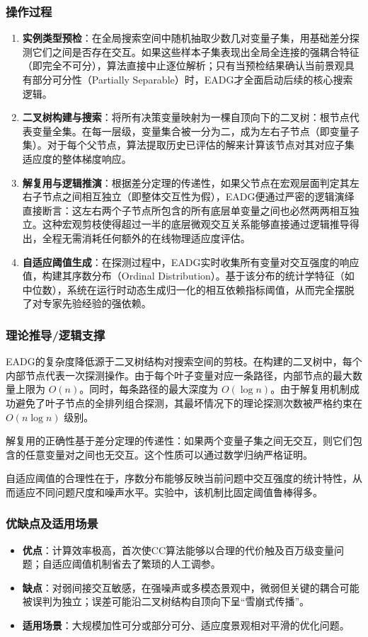 \subsubsection*{操作过程}
\begin{enumerate}
    \item \textbf{实例类型预检}：在全局搜索空间中随机抽取少数几对变量子集，用基础差分探测它们之间是否存在交互。如果这些样本子集表现出全局全连接的强耦合特征（即完全不可分），算法直接中止逐位解析；只有当预检结果确认当前景观具有部分可分性（Partially Separable）时，EADG才全面启动后续的核心搜索逻辑。
    \item \textbf{二叉树构建与搜索}：将所有决策变量映射为一棵自顶向下的二叉树：根节点代表变量全集。在每一层级，变量集合被一分为二，成为左右子节点（即变量子集）。对于每个父节点，算法提取历史已评估的解来计算该节点对其对应子集适应度的整体梯度响应。
    \item \textbf{解复用与逻辑推演}：根据差分定理的传递性，如果父节点在宏观层面判定其左右子节点之间相互独立（即整体交互性为假），EADG便通过严密的逻辑演绎直接断言：这左右两个子节点所包含的所有底层单变量之间也必然两两相互独立。这种宏观剪枝使得超过一半的底层微观交互关系能够直接通过逻辑推导得出，全程无需消耗任何额外的在线物理适应度评估。
    \item \textbf{自适应阈值生成}：在探测过程中，EADG实时收集所有变量对交互强度的响应值，构建其序数分布（Ordinal Distribution）。基于该分布的统计学特征（如中位数），系统在运行时动态生成归一化的相互依赖指标阈值，从而完全摆脱了对专家先验经验的强依赖。
\end{enumerate}

\subsubsection*{理论推导/逻辑支撑}
EADG的复杂度降低源于二叉树结构对搜索空间的剪枝。在构建的二叉树中，每个内部节点代表一次探测操作。由于每个叶子变量对应一条路径，内部节点的最大数量上限为 $O(n)$。同时，每条路径的最大深度为 $O(\log n)$。由于解复用机制成功避免了叶子节点的全排列组合探测，其最坏情况下的理论探测次数被严格约束在 $O(n \log n)$ 级别。

解复用的正确性基于差分定理的传递性：如果两个变量子集之间无交互，则它们包含的任意变量对之间也无交互。这个性质可以通过数学归纳严格证明。

自适应阈值的合理性在于，序数分布能够反映当前问题中交互强度的统计特性，从而适应不同问题尺度和噪声水平。实验中，该机制比固定阈值鲁棒得多。

\subsubsection*{优缺点及适用场景}
\begin{itemize}
    \item \textbf{优点}：计算效率极高，首次使CC算法能够以合理的代价触及百万级变量问题；自适应阈值机制省去了繁琐的人工调参。
    \item \textbf{缺点}：对弱间接交互敏感，在强噪声或多模态景观中，微弱但关键的耦合可能被误判为独立；误差可能沿二叉树结构自顶向下呈“雪崩式传播”。
    \item \textbf{适用场景}：大规模加性可分或部分可分、适应度景观相对平滑的优化问题。
\end{itemize}

